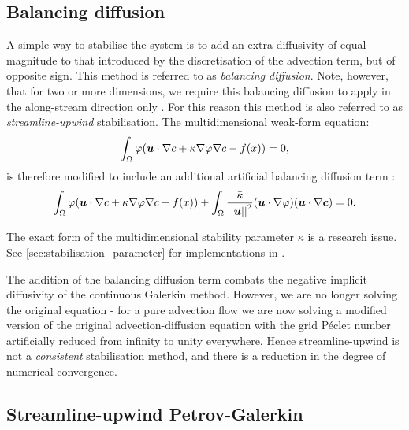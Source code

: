 \subsection{Balancing diffusion}\label{sec:balancing_diffusion}

A simple way to stabilise the system is to add an extra diffusivity of
equal magnitude to that introduced by the discretisation of the advection term,
but of opposite sign. This method is referred to as \textit{balancing diffusion}.
Note, however, that for two or more dimensions, we require this balancing
diffusion to apply in the along-stream direction only \citep{brooks1982, DoneaBook}.
For this reason this method is also referred to as \textit{streamline-upwind}
stabilisation. The multidimensional weak-form equation:
\begin{equation}\label{eqn:trivial_advdif_weak_md}
  \int_\Omega \varphi ({\mbox{\boldmath$u$}} \cdot \nabla c + \kappa \nabla \varphi \nabla c -f(x)) = 0,
\end{equation}
is therefore modified to include an additional artificial balancing diffusion
term \citep{DoneaBook}:
\begin{equation}\label{eqn:balancing_diffusion}
  \int_\Omega \varphi ({\mbox{\boldmath$u$}} \cdot \nabla c + \kappa \nabla \varphi \nabla c - f(x)) +
  \int_\Omega \frac{\bar{\kappa}}{\left|\left| {\mbox{\boldmath$u$}} \right|\right|^2}
  ({\mbox{\boldmath$u$}} \cdot \nabla \varphi) ({\mbox{\boldmath$u$}} \cdot \nabla {\mbox{\boldmath$c$}})
  = 0.
\end{equation}

The exact form of the multidimensional stability parameter $\bar{\kappa}$
is a research issue. See \ref{sec:stabilisation_parameter} for implementations in
\fluidity.

The addition of the balancing diffusion term combats the negative implicit
diffusivity of the continuous Galerkin method. However, we are no longer solving
the original equation - for a pure advection flow we are now solving a modified
version of the original advection-diffusion equation with the grid
P\'eclet number artificially reduced from
infinity to unity everywhere. Hence streamline-upwind is not a \textit{consistent}
stabilisation method, and there is a reduction in the degree of numerical
convergence.

\subsection{Streamline-upwind Petrov-Galerkin}\label{sec:supg}

